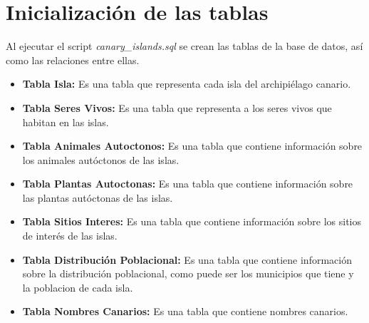 \documentclass[11pt]{report}
\begin{document}
\section{Inicialización de las tablas}
Al ejecutar el script \emph{canary\_islands.sql} se crean las tablas de la base de datos, así como las relaciones entre ellas.
\begin{itemize}
      \item \textbf{Tabla Isla:} Es una tabla que representa cada isla del archipiélago canario.
            \lstset{style=mystyle}
            

      \item \textbf{Tabla Seres Vivos:} Es una tabla que representa a los seres vivos que habitan en las islas.
            \lstset{style=mystyle}
            

      \item \textbf{Tabla Animales Autoctonos:} Es una tabla que contiene información sobre los animales autóctonos de las islas.
            \lstset{style=mystyle}
            

            \newpage

      \item \textbf{Tabla Plantas Autoctonas:} Es una tabla que contiene información sobre las plantas autóctonas de las islas.
            \lstset{style=mystyle}
            

      \item \textbf{Tabla Sitios Interes:} Es una tabla que contiene información sobre los sitios de interés de las islas.
            \lstset{style=mystyle}
            

      \item \textbf{Tabla Distribución Poblacional:} Es una tabla que contiene información sobre la distribución poblacional, como puede ser los municipios que tiene y la poblacion de cada isla.
            \lstset{style=mystyle}
            

      \item \textbf{Tabla Nombres Canarios:} Es una tabla que contiene nombres canarios.
            \lstset{style=mystyle}
            


\end{itemize}
\end{document}
